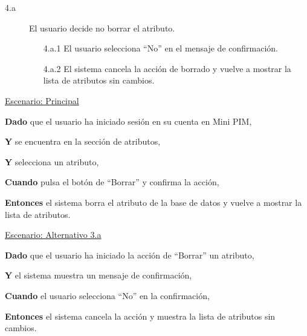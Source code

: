 \begin{description}

    \item[4.a] El usuario decide no borrar el atributo.
    \begin{enumerate}
        \item[4.a.1] El usuario selecciona \enquote{No} en el mensaje de confirmación.
        \item[4.a.2] El sistema cancela la acción de borrado y vuelve a mostrar la lista de atributos sin cambios.
    \end{enumerate}

\end{description}

\underline{Escenario: Principal}\par
\vspace{0.15cm}
\textbf{Dado} que el usuario ha iniciado sesión en su cuenta en Mini PIM,\par
\textbf{Y} se encuentra en la sección de atributos,\par
\textbf{Y} selecciona un atributo,\par
\textbf{Cuando} pulsa el botón de \enquote{Borrar} y confirma la acción,\par
\textbf{Entonces} el sistema borra el atributo de la base de datos y vuelve a mostrar la lista de atributos.\par
\vspace{0.20cm}

\underline{Escenario: Alternativo 3.a}\par
\vspace{0.15cm}
\textbf{Dado} que el usuario ha iniciado la acción de \enquote{Borrar} un atributo,\par
\textbf{Y} el sistema muestra un mensaje de confirmación,\par
\textbf{Cuando} el usuario selecciona \enquote{No} en la confirmación,\par
\textbf{Entonces} el sistema cancela la acción y muestra la lista de atributos sin cambios.\par

\vspace{0.20cm}


